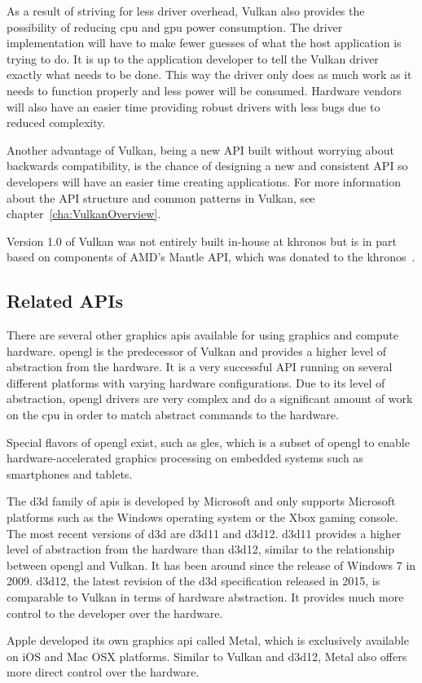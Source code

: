     As a result of striving for less driver overhead, Vulkan also provides the possibility of reducing \gls{cpu} and \gls{gpu} power consumption.
    The driver implementation will have to make fewer guesses of what the host application is trying to do.
    It is up to the application developer to tell the Vulkan driver exactly what needs to be done.
    This way the driver only does as much work as it needs to function properly and less power will be consumed.
    Hardware vendors will also have an easier time providing robust drivers with less bugs due to reduced complexity.

    Another advantage of Vulkan, being a new API built without worrying about backwards compatibility, is the chance of designing a new and consistent API so developers will have an easier time creating applications.
    For more information about the API structure and common patterns in Vulkan, see chapter~\ref{cha:VulkanOverview}.

    Version 1.0 of Vulkan was not entirely built in-house at \gls{khronos} but is in part based on components of AMD's Mantle API, which was donated to the \gls{khronos}~\cite{vksessiongdc15}.


    \subsection{Related APIs}
      There are several other graphics \glspl{api} available for using graphics and compute hardware.
      \gls{opengl} is the predecessor of Vulkan and provides a higher level of abstraction from the hardware.
      It is a very successful API running on several different platforms with varying hardware configurations.
      Due to its level of abstraction, \gls{opengl} drivers are very complex and do a significant amount of work on the \gls{cpu} in order to match abstract commands to the hardware.

      Special flavors of \gls{opengl} exist, such as \gls{gles}, which is a subset of \gls{opengl} to enable hardware-accelerated graphics processing on embedded systems such as smartphones and tablets.

      The \gls{d3d} family of \glspl{api} is developed by Microsoft and only supports Microsoft platforms such as the Windows operating system or the Xbox gaming console.
      The most recent versions of \gls{d3d} are \gls{d3d11} and \gls{d3d12}.
      \gls{d3d11} provides a higher level of abstraction from the hardware than \gls{d3d12}, similar to the relationship between \gls{opengl} and Vulkan.
      It has been around since the release of Windows 7 in 2009.
      \gls{d3d12}, the latest revision of the \gls{d3d} specification released in 2015, is comparable to Vulkan in terms of hardware abstraction.
      It provides much more control to the developer over the hardware.

      Apple developed its own graphics \gls{api} called Metal, which is exclusively available on iOS and Mac OSX platforms.
      Similar to Vulkan and \gls{d3d12}, Metal also offers more direct control over the hardware.

